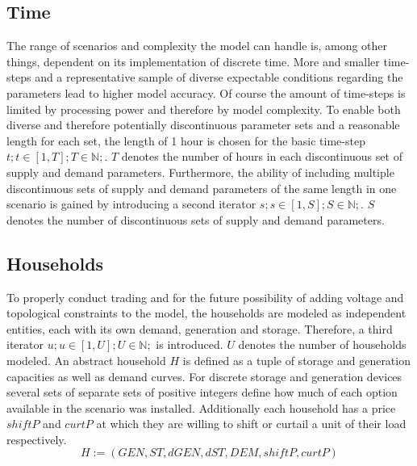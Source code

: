 \documentclass[
	11pt,								%
	DIV10,								%
	a4paper,         					%
	oneside,							%
	headheight=20pt,					%
	footheight=20pt,					%
    parskip=full,						%
    listof=totoc,						%
	bibliography=totoc,					%
	index=totoc,						%
]{scrartcl}
\begin{document}
\subsection{Time}
The range of scenarios and complexity the model can handle is, among other things, dependent on its implementation of discrete time. More and smaller time-steps and a representative sample of diverse expectable conditions regarding the parameters lead to higher model accuracy. Of course the amount of time-steps is limited by processing power and therefore by model complexity. To enable both diverse and therefore potentially discontinuous parameter sets and a reasonable length for each set, the length of 1 hour is chosen for the basic time-step 
$t; t \in [1,T]; T \in \mathbb{N} ;$. $T$ denotes the number of hours in each discontinuous set of supply and demand parameters.
Furthermore, the ability of including multiple discontinuous sets of supply and demand parameters of the same length in one scenario is gained by introducing a second iterator 
$s; s \in [1,S]; S \in \mathbb{N} ;$. $S$ denotes the number of discontinuous sets of supply and demand parameters.





\subsection{Households}
To properly conduct trading and for the future possibility of adding voltage and topological constraints to the model, the households are modeled as independent entities, each with its own demand, generation and storage. Therefore, a third iterator $u; u \in [1,U]; U \in \mathbb{N};$ is introduced. $U$ denotes the number of households modeled.
An abstract household $H$ is defined as a tuple of storage and generation capacities as well as demand curves. For discrete storage and generation devices several sets of separate sets of positive integers define how much of each option available in the scenario was installed. Additionally each household has a price $shiftP$ and $curtP$ at which they are willing to shift or curtail a unit  of their load respectively.
\begin{equation}
	H := (GEN, ST, dGEN, dST, DEM, shiftP, curtP)
\end{equation}
\end{document}
